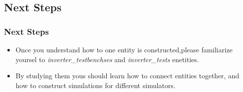 \documentclass{sdkslides}
\begin{document}
\renewcommand{\sectionname}{Next Steps}
\subsection*{\sectionname}
\begin{frame}[c]
    \frametitle{\sectionname}
    \begin{itemize}
        \item Once you understand how to one entity is constructed,please
            familiarize yoursel to \emph{inverter\_testbenchses} and
            \emph{inverter\_tests} enetities.
        \item By studying them yous should learn how to connect entities
            together, and how to construct simulations for different
            simulators.
    \end{itemize}
\end{frame}
\end{document}
